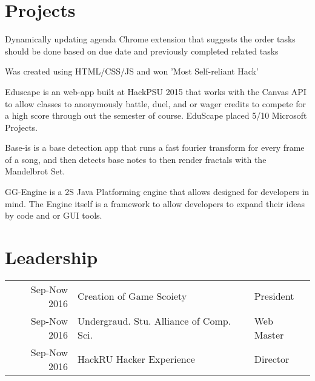 \documentclass[]{deedy-resume-openfont}
\begin{document}
\begin{minipage}[t]{0.66\textwidth}
\section{Projects}
\begin{tightemize}
\item Dynamically updating agenda Chrome extension that suggests the order tasks should be done based on due date and previously completed related tasks
\item Was created using HTML/CSS/JS and won 'Most Self-reliant Hack'
\end{tightemize}
\sectionsep

\begin{tightemize}
\item Eduscape is an web-app built at HackPSU 2015 that works with the Canvas API to allow classes to anonymously battle, duel, and or wager credits to compete for a high score through out the semester of course. EduScape placed 5/10 Microsoft Projects.  
\end{tightemize}
\sectionsep

Base-is is a base detection app that runs a fast fourier transform for every frame of a song, and then detects base notes to then render fractals with the Mandelbrot Set. 
\sectionsep

GG-Engine is a 2S Java Platforming engine that allows designed for developers in mind. The Engine itself is a framework to allow developers to expand their ideas by code and or GUI tools.
\sectionsep


\section{Leadership} 
\begin{tabular}{rll}
Sep-Now 2016 & Creation of Game Scoiety & President\\
Sep-Now 2016 &Undergraud. Stu. Alliance of Comp. Sci.&  Web Master\\
Sep-Now 2016 & HackRU Hacker Experience   & Director\\ 

\end{tabular}
\sectionsep

\end{minipage} 
\end{document}
